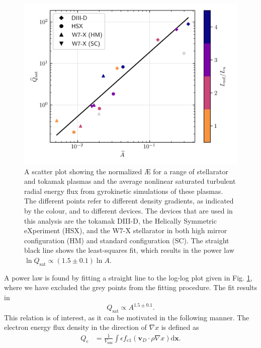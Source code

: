 \begin{figure}
    \centering
    \includegraphics{3_chapters/1_papers/AE-TE/figures/plot_AE_Q_corr.png}
    \caption{A scatter plot showing the normalized \AE{} for a range of stellarator and tokamak plasmas and the average nonlinear saturated turbulent radial energy flux from gyrokinetic simulations of these plasmas. The different points refer to different density gradients, as indicated by the colour, and to different devices. The devices that are used in this analysis are the tokamak DIII-D, the Helically Symmetric eXperiment (HSX), and the W7-X stellarator in both high mirror configuration (HM) and standard configuration (SC). The straight black line shows the least-squares fit, which results in the power law $\ln Q_\text{sat} \propto (1.5 \pm 0.1) \ln A. $}
    \label{fig:scatter_plot_AE}
\end{figure}
A power law is found by fitting a straight line to the log-log plot given in Fig. \ref{fig:scatter_plot_AE}, where we have excluded the grey points from the fitting procedure. The fit results in
\begin{equation}
    Q_\text{sat} \propto A^{1.5 \pm 0.1}.
\end{equation}
This relation is of interest, as it can be motivated in the following manner. The electron energy flux density in the direction of $\nabla x$ is defined as
\begin{equation}
    \begin{aligned}
        {Q}_e &= \frac{1}{V_\text{sim}} \int \epsilon f_{e1} (\boldsymbol{v}_D \cdot 
        \rho\nabla x) \mathrm{d} \boldsymbol{x}.
    \end{aligned}
\end{equation}

